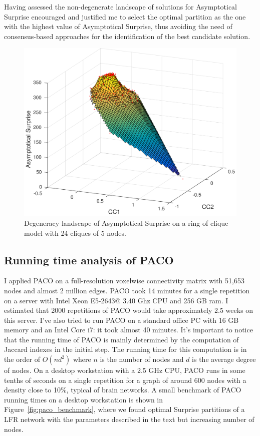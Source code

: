 Having assessed the non-degenerate landscape of solutions for Asymptotical Surprise encouraged and justified me to select the optimal partition as the one with the highest value of Asymptotical Surprise, thus avoiding the need of consensus-based approaches for the identification of the best candidate solution.
\begin{figure}[!htb]
\centering
\includegraphics[width=1.0\textwidth]{images/filtered_asymp_surp_ring_cliques_5_24_200.png}
\caption{Degeneracy landscape of Asymptotical Surprise on a ring of clique model with 24 cliques of 5 nodes.}
\label{fig:degeneracy_asymptotical_surprise}
\end{figure}

\subsection{Running time analysis of PACO}
I applied PACO on a full-resolution voxelwise connectivity matrix with 51,653 nodes and almost 2 million edges.
PACO took 14 minutes for a single repetition on a server with Intel Xeon E5-2643@ 3.40 Ghz CPU and 256 GB ram.
I estimated that 2000 repetitions of PACO would take approximately 2.5 weeks on this server.
I've also tried to run PACO on a standard office PC with 16 GB memory and an Intel Core i7: it took almost 40 minutes.
It's important to notice that the running time of PACO is mainly determined by the computation of Jaccard indexes in the initial step.
The running time for this computation is in the order of $O(nd^2)$ where $n$ is the number of nodes and $d$ is the average degree of nodes.
On a desktop workstation with a 2.5 GHz CPU, PACO runs in some tenths of seconds on a single repetition for a graph of around 600 nodes with a density close to 10\%, typical of brain networks.
A small benchmark of PACO running times on a desktop workstation is shown in Figure~\ref{fig:paco_benchmark}, where we found optimal Surprise partitions of a LFR network with the parameters described in the text but increasing number of nodes.

